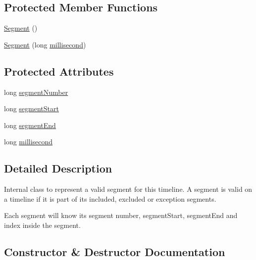 \subsection*{Protected Member Functions}
\begin{DoxyCompactItemize}
\item 
\mbox{\hyperlink{classorg_1_1jfree_1_1chart_1_1axis_1_1_segmented_timeline_1_1_segment_a9fbe203d339d0b02037dd6ea401dfde1}{Segment}} ()
\item 
\mbox{\hyperlink{classorg_1_1jfree_1_1chart_1_1axis_1_1_segmented_timeline_1_1_segment_a546949c71810e55bde8695dafeb64bc8}{Segment}} (long \mbox{\hyperlink{classorg_1_1jfree_1_1chart_1_1axis_1_1_segmented_timeline_1_1_segment_ab9d266edee01793920a3d76b8c6652c9}{millisecond}})
\end{DoxyCompactItemize}
\subsection*{Protected Attributes}
\begin{DoxyCompactItemize}
\item 
long \mbox{\hyperlink{classorg_1_1jfree_1_1chart_1_1axis_1_1_segmented_timeline_1_1_segment_a4aac1eddddb9ba3b259d083c05660ff9}{segment\+Number}}
\item 
long \mbox{\hyperlink{classorg_1_1jfree_1_1chart_1_1axis_1_1_segmented_timeline_1_1_segment_aa0b41743532c266e3638b063555d2af5}{segment\+Start}}
\item 
long \mbox{\hyperlink{classorg_1_1jfree_1_1chart_1_1axis_1_1_segmented_timeline_1_1_segment_a578f6c0a90c8f5f98ff7034dbb83a1dc}{segment\+End}}
\item 
long \mbox{\hyperlink{classorg_1_1jfree_1_1chart_1_1axis_1_1_segmented_timeline_1_1_segment_ab9d266edee01793920a3d76b8c6652c9}{millisecond}}
\end{DoxyCompactItemize}


\subsection{Detailed Description}
Internal class to represent a valid segment for this timeline. A segment is valid on a timeline if it is part of its included, excluded or exception segments. 

Each segment will know its segment number, segment\+Start, segment\+End and index inside the segment. 

\subsection{Constructor \& Destructor Documentation}
\mbox{\label{classorg_1_1jfree_1_1chart_1_1axis_1_1_segmented_timeline_1_1_segment_a9fbe203d339d0b02037dd6ea401dfde1}} 
